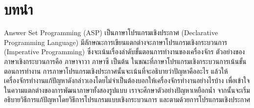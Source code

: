\chapter{บทนำ}
\par{
Answer Set Programming (ASP) 
เป็นภาษาโปรแกรมเชิงประกาศ 
(Declarative Programming Language)
มีลักษณะการเขียนแตกต่างจะภาษาโปรแกรมเชิงกระบวนการ 
(Imperative Programming) 
ซึ่งจะเน้นเรื่องลำดับขั้นตอนการทำงานของเครื่องจักร 
ตัวอย่างของภาษาเชิงกระบวนการคือ ภาษาจาวา ภาษาซี เป็นต้น
ในขณะที่ภาษาโปรแกรมเชิงกระบวนการเน้นขั้นตอนการทำงาน 
การภาษาโปรแกรมเชิงประกาศนั้นจะเน้นที่จะอธิบายว่าปัญหาคืออะไร 
แล้วให้เครื่องจักรทำงานแก้ปัญหาดังกล่าวเองโดยไม่จำเป็นต้องบอกให้เครื่องจักรทำงานอย่างไรบ้าง
เพื่อเข้าใจในความแตกต่างของการพัฒนาภาษาทั้งสองรูปแบบ 
เราจะศึกษาตัวอย่างปัญหาเหยือกน้ำ
จากนั้นจะเริ่มอธิบายวิธีการแก้ปัญหาโดยวิธีการโปรแกรมแบบเชิงกระบวนการ
และตามด้วยการโปรแกรมเชิงประกาศ
}
%
